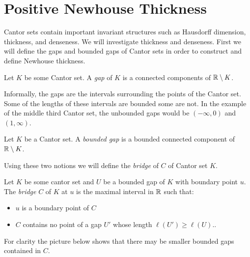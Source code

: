 \section{Positive Newhouse Thickness}
Cantor sets contain important invariant structures such as Hausdorff dimension, thickness, and denseness.  We will investigate thickness and denseness.  First we will define the gaps and bounded gaps of Cantor sets in order to construct and define Newhouse thickness.  

  
\begin{definition}[Gap]
    Let $K$ be some Cantor set.  A \textit{gap} of $K$ is a connected components of $\mathbb{R} \setminus K$.      
\end{definition}  Informally, the gaps are the intervals surrounding the points of the Cantor set.  Some of the lengths of these intervals are bounded some are not.  In the example of the middle third Cantor set, the unbounded gaps would be $(-\infty, 0)$ and $(1, \infty)$.  

\begin{definition}
    Let $K$ be a Cantor set.  A \textit{bounded gap} is a bounded connected component of $\mathbb{R} \setminus K$.      
\end{definition}

Using these two notions we will define the \textit{bridge} of $C$ of Cantor set $K$.  
\begin{definition}[Bridge]\cite{palis&takens}
    Let $K$ be some cantor set and $U$ be a bounded gap of $K$ with boundary point $u$.  The \textit{bridge} $C$ of $K$ at $u$ is the maximal interval in $\mathbb{R}$ such that:
    \begin{itemize}
        \item $u$ is a boundary point of $C$
        \item $C$ contains no point of a gap $U'$ whose length $\ell(U') \geq \ell(U)$..
    \end{itemize}
\end{definition}

For clarity the picture below shows that there may be smaller bounded gaps contained in $C$.  

\vspace*{0.25cm}
{}

